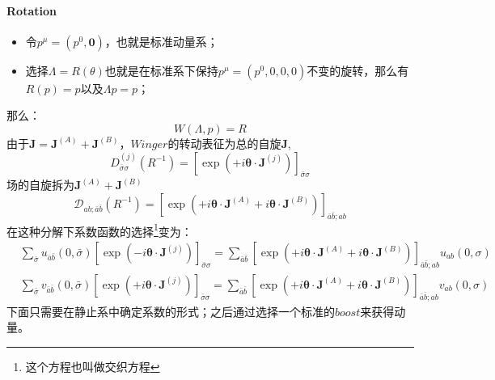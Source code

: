 \paragraph*{Rotation}
\begin{itemize}
  \item 令$p^\mu=(p^0,\boldsymbol{0})$，也就是标准动量系；
  \item 选择$\Lambda=R(\theta)$也就是在标准系下保持$p^\mu=(p^0,0,0,0)$不变的旋转，那么有$R(p)=p$以及$\Lambda p=p$；
\end{itemize}
那么：
\[W(\Lambda,p)=R\]
\color{blue}由于$\boldsymbol{J}=\boldsymbol{J}^{(A)}+\boldsymbol{J}^{(B)}$，$Winger$的转动表征为总的自旋$\boldsymbol{J}$,
$$ D_{\bar{\sigma}\sigma}^{(j)}(R^{-1}) = \left[ \exp\left( +i \boldsymbol{\theta}\cdot\boldsymbol{J}^{(j)} \right) \right]_{\bar{\sigma}\sigma} $$
场的自旋拆为$\boldsymbol{J}^{(A)}+\boldsymbol{J}^{(B)}$
\[\mathscr{D}_{{ab};\bar{a}\bar{{b}}}(R^{-1})=\left[\exp\left( +i \boldsymbol{\theta}\cdot\boldsymbol{J}^{(A)}+i \boldsymbol{\theta}\cdot\boldsymbol{J}^{(B)}\right) \right]_{\bar{a}\bar{{b}};{ab}}\]\normalcolor
在这种分解下系数函数的选择\footnote{这个方程也叫做交织方程}变为：
\begin{subequations}\label{u_0}
    \begin{align}
            &\sum_{\bar{\sigma}} 
            u_{\bar{a}\bar{b}}(0,\bar{\sigma})\left[ \exp\left( -i \boldsymbol{\theta}\cdot\boldsymbol{J}^{(j)} \right) \right]_{\bar{\sigma}\sigma} =
            \sum_{\bar{a}\bar{b}}
            \left[\exp\left(  +i \boldsymbol{\theta}\cdot\boldsymbol{J}^{(A)}+i \boldsymbol{\theta}\cdot\boldsymbol{J}^{(B)} \right) \right]_{\bar{a}\bar{{b}};{ab}}
            u_{ab}(0,\sigma)
            \\
            &\sum_{\bar{\sigma}} 
            v_{\bar{a}\bar{b}}(0,\bar{\sigma})\left[ \exp\left( +i \boldsymbol{\theta}\cdot\boldsymbol{J}^{(j)} \right) \right]_{\bar{\sigma}\sigma} =
            \sum_{\bar{a}\bar{b}}
            \left[\exp\left(  +i \boldsymbol{\theta}\cdot\boldsymbol{J}^{(A)}+i \boldsymbol{\theta}\cdot\boldsymbol{J}^{(B)} \right) \right]_{\bar{a}\bar{{b}};{ab}}
            v_{ab}(0,\sigma)
            \end{align}
\end{subequations}
\color{blue}下面只需要在静止系中确定系数的形式；之后通过选择一个标准的$boost$来获得动量。\normalcolor
{}
